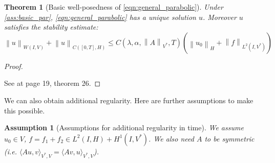 \documentclass[english,a4paper,10pt,oneside]{scrbook}	%
\theoremstyle{break}
\newtheorem{thm}[equation]{Theorem}
\newtheorem{ass}[equation]{Assumption}
\newenvironment{mproof}[1][\proofname]{%
  \begin{proof}[#1]$ $\par\nobreak\ignorespaces
}{%
  \end{proof}
}
\renewcommand*{\proofname}{Proof}
\theoremstyle{remark}
\newcommand{\norm}[1]{\left\lVert#1\right\rVert}
\newcommand{\HN}[1]{\norm{#1}_{H}}
\newcommand{\VN}[1]{\norm{#1}_{V}}
\newcommand{\VSN}[1]{\norm{#1}_{V^*}}
\begin{document}
\begin{appendices}
\begin{thm}[Basic well-posedness of \cref{eqn:general_parabolic}]
\label{thm:well_pos_parabolic}
Under \cref{ass:basic_par}, \cref{eqn:general_parabolic} has a unique solution $u$. Moreover $u$ satisfies the stability estimate:
\begin{equation}
	\label{eqn:en_est}
	\norm{u}_{W(I,V)} + \norm{u}_{C([0,T],H)}\leq C(\lambda, \alpha, \VSN{A}, T)(\HN{u_0}+\norm{f}_{L^2(I,V^*)})
\end{equation} 
\end{thm}
\begin{mproof}
See \cite{gilardi} at page 19, theorem 26.
\end{mproof}

We can also obtain additional regularity. Here are further assumptions to make this possible.

\begin{ass}[Assumptions for additional regularity in time]
\label{ass:reg_par}
We assume $u_0 \in V$, $f = f_1+f_2 \in L^2(I,H)+H^1(I,V^*)$. We also need $A$ to be symmetric (i.e. $\langle Au,v \rangle_{V^*,V} = \langle Av,u \rangle_{V^*,V}$).
\end{ass}

%
% 
%
%


\end{appendices}
\end{document}
